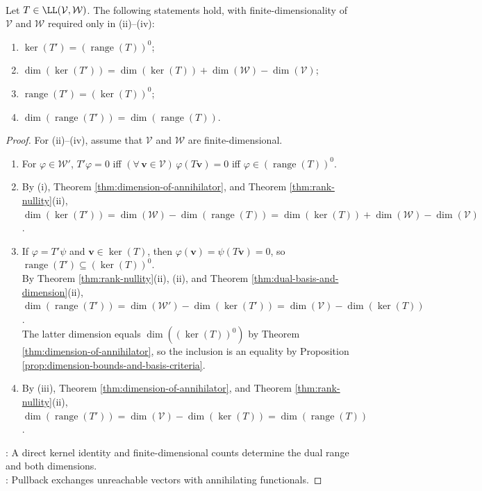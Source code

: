 \begin{theorem} \label{thm:dual-kernel-range-annihilator} \\
Let $T\in\LL(\mathcal{V},\mathcal{W})$. The following statements hold, with finite-dimensionality of $\mathcal{V}$ and $\mathcal{W}$ required only in (ii)--(iv):
\begin{enumerate}[label=(\roman*)]
\setlength{\itemsep}{0pt}
\item $\ker(T')=(\operatorname{range}(T))^0$;
\item $\dim(\ker(T'))=\dim(\ker(T))+\dim(\mathcal{W})-\dim(\mathcal{V})$;
\item $\operatorname{range}(T')=(\ker(T))^0$;
\item $\dim(\operatorname{range}(T'))=\dim(\operatorname{range}(T))$.
\end{enumerate}
\begin{proof}
For (ii)--(iv), assume that $\mathcal{V}$ and $\mathcal{W}$ are finite-dimensional.
\begin{enumerate}[label=(\roman*)]
\setlength{\itemsep}{0pt}
\item For $\varphi\in\mathcal{W}'$, $T'\varphi=0$ iff $(\forall\,\mathbf{v}\in\mathcal{V})\,\varphi(T\mathbf{v})=0$ iff $\varphi\in(\operatorname{range}(T))^0$.
\item By (i), Theorem \ref{thm:dimension-of-annihilator}, and Theorem \ref{thm:rank-nullity}(ii), $\dim(\ker(T'))=\dim(\mathcal{W})-\dim(\operatorname{range}(T))=\dim(\ker(T))+\dim(\mathcal{W})-\dim(\mathcal{V})$.
\item If $\varphi=T'\psi$ and $\mathbf{v}\in\ker(T)$, then $\varphi(\mathbf{v})=\psi(T\mathbf{v})=0$, so $\operatorname{range}(T')\subseteq(\ker(T))^0$.\\
By Theorem \ref{thm:rank-nullity}(ii), (ii), and Theorem \ref{thm:dual-basis-and-dimension}(ii), $\dim(\operatorname{range}(T'))=\dim(\mathcal{W}')-\dim(\ker(T'))=\dim(\mathcal{V})-\dim(\ker(T))$.\\
The latter dimension equals $\dim((\ker(T))^0)$ by Theorem \ref{thm:dimension-of-annihilator}, so the inclusion is an equality by Proposition \ref{prop:dimension-bounds-and-basis-criteria}.
\item By (iii), Theorem \ref{thm:dimension-of-annihilator}, and Theorem \ref{thm:rank-nullity}(ii), $\dim(\operatorname{range}(T'))=\dim(\mathcal{V})-\dim(\ker(T))=\dim(\operatorname{range}(T))$.
\end{enumerate}
: A direct kernel identity and finite-dimensional counts determine the dual range and both dimensions.\\
: Pullback exchanges unreachable vectors with annihilating functionals.
\end{proof}
\end{theorem}

